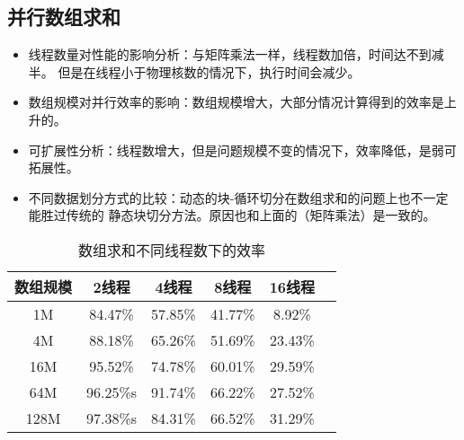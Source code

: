 \documentclass{SYSUReport}
\begin{document}
\subsection{并行数组求和}
\begin{itemize}
    \item 线程数量对性能的影响分析：与矩阵乘法一样，线程数加倍，时间达不到减半。 但是在线程小于物理核数的情况下，执行时间会减少。
    \item 数组规模对并行效率的影响：数组规模增大，大部分情况计算得到的效率是上升的。
    \item 可扩展性分析：线程数增大，但是问题规模不变的情况下，效率降低，是弱可拓展性。
    \item 不同数据划分方式的比较：动态的块-循环切分在数组求和的问题上也不一定能胜过传统的
    静态块切分方法。原因也和上面的（矩阵乘法）是一致的。
\end{itemize}
\begin{table}[h]
    \centering
    \caption{数组求和不同线程数下的效率}
    \begin{tabular}{cccccc}
    \toprule
    数组规模  & 2线程 & 4线程 & 8线程 & 16线程 \\
    \midrule
    1M  &84.47\% &57.85\% &41.77\% &8.92\% \\
    4M  &88.18\% &65.26\% &51.69\% &23.43\%\\
    16M  &95.52\% &74.78\% &60.01\% &29.59\% \\
    64M  &96.25\%s &91.74\% &66.22\% &27.52\% \\
    128M  &97.38\%s &84.31\% &66.52\% &31.29\% \\
    
\bottomrule
\end{tabular}
\end{table}
\end{document}
